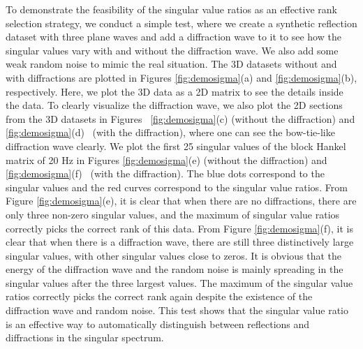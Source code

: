 To demonstrate the feasibility of the singular value ratios as an effective rank selection strategy, we conduct a simple test, where we create a synthetic reflection dataset with three plane waves and add a diffraction wave to it to see how the singular values vary with and without the diffraction wave. We also add some weak random noise to mimic the real situation. The 3D datasets without and with diffractions are plotted in Figures \ref{fig:demosigma}(a) and \ref{fig:demosigma}(b), respectively. Here, we plot the 3D data as a 2D matrix to see the details inside the data. To clearly visualize the diffraction wave, we also plot the 2D sections from the 3D datasets in Figures  \ref{fig:demosigma}(c) (without the diffraction) and \ref{fig:demosigma}(d)  (with the diffraction), where one can see the bow-tie-like diffraction wave clearly. We plot the first 25 singular values of the block Hankel matrix of 20 Hz in Figures \ref{fig:demosigma}(e) (without the diffraction) and \ref{fig:demosigma}(f)  (with the diffraction). The blue dots correspond to the singular values and the red curves correspond to the singular value ratios. From Figure \ref{fig:demosigma}(e), it is clear that when there are no diffractions, there are only three non-zero singular values, and the maximum of singular value ratios correctly picks the correct rank of this data. From Figure \ref{fig:demosigma}(f), it is clear that when there is a diffraction wave, there are still three distinctively large singular values, with other singular values close to zeros. It is obvious that the energy of the diffraction wave and the random noise is mainly spreading in the singular values after the three largest values. The maximum of the singular value ratios correctly picks the correct rank again despite the existence of the diffraction wave and random noise. This test shows that the singular value ratio is an effective way to automatically distinguish between reflections and diffractions in the singular spectrum. 



